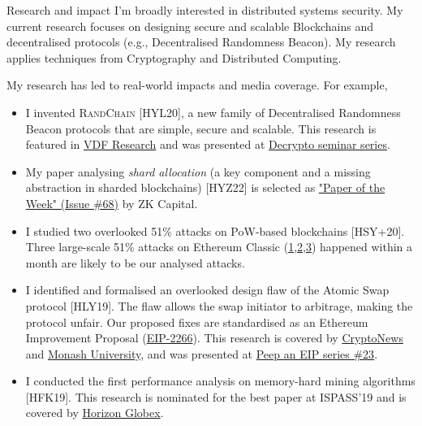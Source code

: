 \documentclass{resume} %
\begin{document}
\begin{rSection}{Research and impact}
    I'm broadly interested in distributed systems security.
    My current research focuses on designing secure and scalable Blockchains and decentralised protocols (e.g., Decentralised Randomness Beacon).
    My research applies techniques from Cryptography and Distributed Computing.

    My research has led to real-world impacts and media coverage. For example,
    \begin{itemize}
        \item I invented \textsc{RandChain} [HYL20], a new family of Decentralised Randomness Beacon protocols that are simple, secure and scalable. This research is featured in \href{https://vdfresearch.org/}{VDF Research} and was presented at \href{https://decrypto.org/seminar/}{Decrypto seminar series}.
        \item My paper analysing \emph{shard allocation} (a key component and a missing abstraction in sharded blockchains) [HYZ22] is selected as \href{https://zkcapital.substack.com/}{"Paper of the Week" (Issue \#68)} by ZK Capital.
        \item I studied two overlooked 51\% attacks on PoW-based blockchains [HSY+20]. Three large-scale 51\% attacks on Ethereum Classic (\href{https://news.bitcoin.com/ethereum-classic-suffers-51-attack-again-delisting-risk-amplified}{1},\href{https://decrypt.co/40196/hackers-launch-third-51-attack-on-ethereum-classic-this-month}{2},\href{https://coingeek.com/over-1m-double-spent-in-latest-ethereum-classic-51-attack}{3}) happened within a month are likely to be our analysed attacks.
        \item I identified and formalised an overlooked design flaw of the Atomic Swap protocol [HLY19]. The flaw allows the swap initiator to arbitrage, making the protocol unfair. Our proposed fixes are standardised as an Ethereum Improvement Proposal (\href{https://github.com/ethereum/EIPs/issues/2266}{EIP-2266}). This research is covered by \href{https://cryptonews.com.au/monash-university-researchers-developing-cryptocurrency-transaction-platform}{CryptoNews} and \href{https://www.monash.edu/blockchain/news/to-realise-their-potential,-business-blockchains-must-learn-to-communicate}{Monash University}, and was presented at \href{https://www.youtube.com/watch?v=wwWcfl9N65k}{Peep an EIP series \#23}.
        \item I conducted the first performance analysis on memory-hard mining algorithms [HFK19]. This research is nominated for the best paper at ISPASS'19 and is covered by \href{https://medium.com/@horizonfintex/blockchain-research-bytes-1-9d023e080765}{Horizon Globex}.
    \end{itemize}


\end{rSection}
\end{document}
